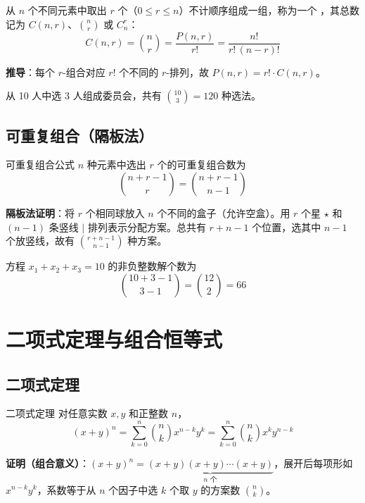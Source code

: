 \begin{mydefinition}{}
从 $n$ 个不同元素中取出 $r$ 个（$0 \leq r \leq n$）不计顺序组成一组，称为一个 ，其总数记为 $C(n, r)$、$\binom{n}{r}$ 或 $C_n^r$：
\[
C(n, r) = \binom{n}{r} = \frac{P(n, r)}{r!} = \frac{n!}{r!\,(n-r)!}
\]
\end{mydefinition}

\textbf{推导}：每个 $r$-组合对应 $r!$ 个不同的 $r$-排列，故 $P(n, r) = r! \cdot C(n, r)$。

\begin{example}
从 10 人中选 3 人组成委员会，共有 $\binom{10}{3} = 120$ 种选法。
\end{example}

\subsection{可重复组合（隔板法）}

\begin{myTheorem}{可重复组合公式}
$n$ 种元素中选出 $r$ 个的可重复组合数为
\[
\binom{n + r - 1}{r} = \binom{n + r - 1}{n - 1}
\]
\end{myTheorem}

\textbf{隔板法证明}：将 $r$ 个相同球放入 $n$ 个不同的盒子（允许空盒）。用 $r$ 个星 $\star$ 和 $(n-1)$ 条竖线 $|$ 排列表示分配方案。总共有 $r + n - 1$ 个位置，选其中 $n-1$ 个放竖线，故有 $\binom{r+n-1}{n-1}$ 种方案。

\begin{example}
方程 $x_1 + x_2 + x_3 = 10$ 的非负整数解个数为
\[
\binom{10 + 3 - 1}{3 - 1} = \binom{12}{2} = 66
\]
\end{example}

\section{二项式定理与组合恒等式}

\subsection{二项式定理}

\begin{myTheorem}{二项式定理}
对任意实数 $x, y$ 和正整数 $n$，
\[
(x + y)^n = \sum_{k=0}^{n} \binom{n}{k} x^{n-k} y^k = \sum_{k=0}^{n} \binom{n}{k} x^k y^{n-k}
\]
\end{myTheorem}

\textbf{证明（组合意义）}：$(x+y)^n = \underbrace{(x+y)(x+y)\cdots(x+y)}_{n\text{ 个}}$，展开后每项形如 $x^{n-k}y^k$，系数等于从 $n$ 个因子中选 $k$ 个取 $y$ 的方案数 $\binom{n}{k}$。

